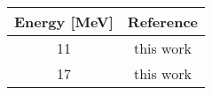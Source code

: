 \begin{tabular}{|c||c|} 
    \hline 
    \bf{Energy [MeV]} & \bf{Reference} \\
    \hline
    \hline 
    11 & this work\\
    17 & this work\\
    \hline
\end{tabular}
